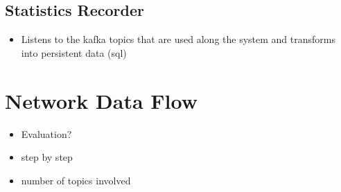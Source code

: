 \subsection{Statistics Recorder}
\begin{itemize}
    \item Listens to the kafka topics that are used along the system and transforms into persistent data (sql)
\end{itemize}

\section{Network Data Flow}
\begin{itemize}
    \item Evaluation?
    \item step by step
    \item number of topics involved
\end{itemize}
